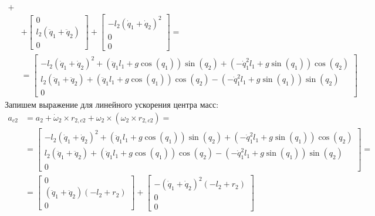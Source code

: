 \documentclass[a4paper,14pt]{extreport}
\begin{document}
\begin{itemize}
\begin{align*}
+\\
&+
\left[\begin{matrix}0\\l_{2} \left(\ddot{q}_1 + \ddot{q}_2\right)\\0\end{matrix}\right]
+
\left[\begin{matrix}- l_{2} \left(\dot{q}_1 + \dot{q}_2\right)^{2}\\0\\0\end{matrix}\right]
=\\
&=
\left[\begin{matrix}- l_{2} \left(\dot{q}_1 + \dot{q}_2\right)^{2} + \left(\ddot{q}_1 l_{1} + g \cos{\left (q_{1} \right )}\right) \sin{\left (q_{2} \right )} + \left(- \dot{q}_1^{2} l_{1} + g \sin{\left (q_{1} \right )}\right) \cos{\left (q_{2} \right )}\\l_{2} \left(\ddot{q}_1 + \ddot{q}_2\right) + \left(\ddot{q}_1 l_{1} + g \cos{\left (q_{1} \right )}\right) \cos{\left (q_{2} \right )} - \left(- \dot{q}_1^{2} l_{1} + g \sin{\left (q_{1} \right )}\right) \sin{\left (q_{2} \right )}\\0\end{matrix}\right]
\end{align*}
Запишем выражение для линейного ускорения центра масс:
\begin{align*}
a_{c2} &= a_2 + \dot \omega_2 \times r_{2,c2} + \omega_2 \times (\omega_2 \times r_{2,c2}) 
=\\
&=
\left[\begin{matrix}- l_{2} \left(\dot{q}_1 + \dot{q}_2\right)^{2} + \left(\ddot{q}_1 l_{1} + g \cos{\left (q_{1} \right )}\right) \sin{\left (q_{2} \right )} + \left(- \dot{q}_1^{2} l_{1} + g \sin{\left (q_{1} \right )}\right) \cos{\left (q_{2} \right )}\\l_{2} \left(\ddot{q}_1 + \ddot{q}_2\right) + \left(\ddot{q}_1 l_{1} + g \cos{\left (q_{1} \right )}\right) \cos{\left (q_{2} \right )} - \left(- \dot{q}_1^{2} l_{1} + g \sin{\left (q_{1} \right )}\right) \sin{\left (q_{2} \right )}\\0\end{matrix}\right]
=\\
&=
\left[\begin{matrix}0\\\left(\ddot{q}_1 + \ddot{q}_2\right) \left(- l_{2} + r_{2}\right)\\0\end{matrix}\right]
+
\left[\begin{matrix}- \left(\dot{q}_1 + \dot{q}_2\right)^{2} \left(- l_{2} + r_{2}\right)\\0\\0\end{matrix}\right]

\end{align*}
\end{itemize}
\end{document}
